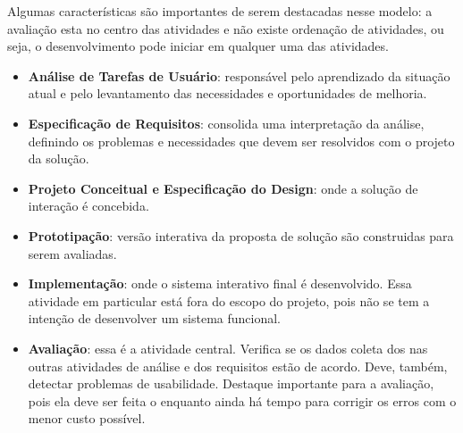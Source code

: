 Algumas características são importantes de serem destacadas nesse modelo: a avaliação esta no centro das atividades e não existe ordenação de atividades, ou seja, o desenvolvimento pode iniciar em qualquer uma das atividades. 
\begin{itemize}
	\item \textbf{Análise de Tarefas de Usuário}: responsável pelo aprendizado da situação atual e pelo levantamento das necessidades e oportunidades de melhoria.
	\item \textbf{Especificação de Requisitos}: consolida uma interpretação da análise, definindo os problemas e necessidades que devem ser resolvidos com o projeto da solução.
	\item \textbf{Projeto Conceitual e Especificação do Design}: onde a solução de interação é concebida.
	\item \textbf{Prototipação}: versão interativa da proposta de solução são construidas para serem avaliadas.
	\item \textbf{Implementação}: onde o sistema interativo final é desenvolvido. Essa atividade em particular está fora do escopo do projeto, pois não se tem a intenção de desenvolver um sistema funcional.
	\item \textbf{Avaliação}: essa é a atividade central. Verifica se os dados coleta dos nas outras atividades de análise e dos requisitos estão de acordo. Deve, também, detectar problemas de usabilidade. Destaque importante para a avaliação, pois ela deve ser feita o enquanto ainda há tempo para corrigir os erros com o menor custo possível.
\end{itemize}




